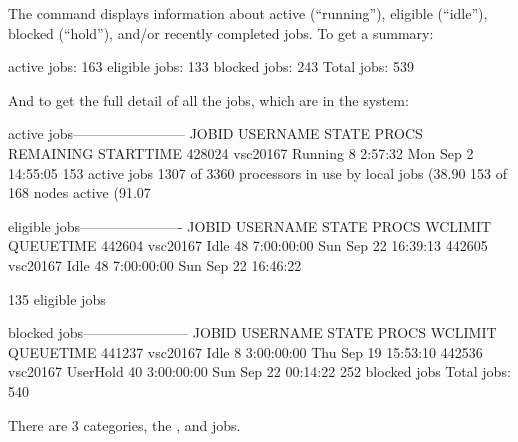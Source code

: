   The  command displays information about active (``running''),
  eligible (``idle''), blocked (``hold''), and/or recently completed jobs. To get
  a summary:

\begin{prompt}
active jobs: 163
eligible jobs: 133
blocked jobs: 243
Total jobs:  539
\end{prompt}

\fi %

\ifantwerpen
And to get the full detail of all the jobs, which are in the system:

\begin{prompt}
active jobs------------------------
JOBID     USERNAME  STATE PROCS REMAINING          STARTTIME
428024    vsc20167  Running   8   2:57:32  Mon Sep  2 14:55:05
153 active jobs 1307 of 3360 processors in use by local jobs (38.90%
153 of 168 nodes active      (91.07%

eligible jobs----------------------
JOBID     USERNAME  STATE PROCS   WCLIMIT            QUEUETIME
442604    vsc20167   Idle  48  7:00:00:00  Sun Sep 22 16:39:13
442605    vsc20167   Idle  48  7:00:00:00  Sun Sep 22 16:46:22

135 eligible jobs

blocked jobs-----------------------
JOBID   USERNAME     STATE PROCS WCLIMIT            QUEUETIME
441237  vsc20167      Idle   8 3:00:00:00 Thu Sep 19 15:53:10
442536  vsc20167  UserHold  40 3:00:00:00 Sun Sep 22 00:14:22
252 blocked jobs
Total jobs:  540
\end{prompt}
\fi  %

\ifbrussel
\else
  There are 3 categories, the ,  and  jobs.

